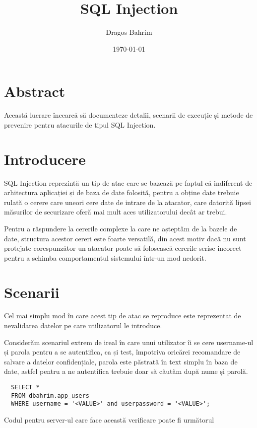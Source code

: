 \documentclass[12pt, a4paper]{report}
\begin{document}
\author{Dragos Bahrim}
\title{SQL Injection}
\date{\today{}}
\maketitle{}
\tableofcontents
\section{Abstract}

Această lucrare încearcă să documenteze detalii, scenarii de execuție și metode de prevenire pentru atacurile de tipul SQL Injection.


\section{Introducere}

SQL Injection reprezintă un tip de atac care se bazează pe faptul că indiferent de 
arhitectura aplicației și de baza de date folosită, pentru a obține date trebuie
rulată o cerere care uneori cere date de intrare de la atacator, care datorită lipsei măsurilor
de securizare oferă mai mult aces utilizatorului decât ar trebui.

Pentru a răspundere la cererile complexe la care ne așteptăm de la bazele de date, structura acestor cereri
este foarte versatilă, din acest motiv dacă nu sunt protejate corespunzător un atacator
poate să folosească cererile scrise incorect pentru a schimba comportamentul sistemului într-un mod nedorit.

\section{Scenarii}
Cel mai simplu mod în care acest tip de atac se reproduce este reprezentat de nevalidarea
datelor pe care utilizatorul le introduce.

Considerăm scenariul extrem de ireal în care unui utilizator îi se cere username-ul și parola pentru
a se autentifica, ca și test, împotriva oricărei recomandare de salvare a datelor confidențiale, 
parola este păstrată în text simplu în baza de date, astfel pentru a ne autentifica trebuie doar să 
căutăm după nume și parolă.

\lstset{language=SQL}
\begin{lstlisting}
  SELECT *
  FROM dbahrim.app_users
  WHERE username = '<VALUE>' and userpassword = '<VALUE>';
\end{lstlisting}


Codul pentru server-ul care face această verificare poate fi următorul
\end{document}
